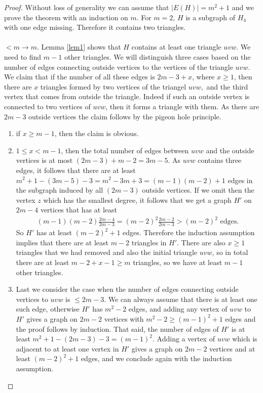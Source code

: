 \documentclass[12pt,a4paper]{article}
\theoremstyle{definition}
\begin{document}
\begin{proof}
Without loss of generality  we can assume that $|E(H)|=m^2+1$ and we prove the theorem with an induction on $m$. For $m=2$, $H$ is a subgraph of $H_4$ with one edge missing. Therefore it contains two triangles. \\
\\
$<m \to m$. Lemma \ref{lem1} shows that $H$ contains at least one triangle $uvw$. We need to find $m-1$ other triangles. We will distinguish three cases based on the number of edges connecting outside vertices to the vertices of the triangle $uvw$. We claim that if the number of all these edges is $2m-3+x$, where $x \geq 1$, then there are $x$ triangles formed by two vertices of the triangel $uvw,$ and the third vertex that comes from outside the triangle. Indeed if such an outside vertex is connected to two vertices of $uvw$, then it forms a triangle with them. As there are $2m-3$ outside vertices the claim follows by the pigeon hole principle.
\begin{enumerate}
\item if $x \geq m-1$,  then the claim is obvious.
\item $1 \leq x < m-1$, then the total number of edges between $uvw$ and the outside vertices is at most $(2m-3)+m-2=3m-5$. As $uvw$ contains three edges, it follows that there are at least $m^2+1-(3m-5)-3=m^2-3m+3=(m-1)(m-2)+1$ edges in the subgraph induced by all $(2m-3)$ outside vertices. If we omit then the vertex $z$ which has the smallest degree, it follows that we get a graph $H'$ on $2m-4$ vertices  that has at least 
\begin{align*}
(m-1)(m-2) \frac{2m-4}{2m-3}=(m-2)^2 \frac{2m-2}{2m-3}>(m-2)^2 \text{ edges.}
\end{align*}
So $H'$ has at least $(m-2)^2 +1$ edges. Therefore the induction assumption implies that there are at least $m-2$ triangles in $H'$. There are also $x\geq 1$ triangles that we had removed and also the initial triangle $uvw$, so in total there are at least  $m-2+x-1\geq m$ triangles, so we have at least $m-1$ other triangles. 
\item Last we consider the case when the number of edges connecting outside vertices to $uvw$ is $ \leq 2m-3$. We can always assume that there is at least one such edge, otherwise $H'$ has $m^2-2$ edges, and adding any vertex of $uvw$ to $H'$ gives a graph on $2m-2$ vertices with $m^2-2 \geq (m-1)^2+1$ edges and the proof follows by induction. That said, the number of edges of $H'$ is at least $m^2+1-(2m-3)-3=(m-1)^2$. Adding a vertex of $uvw$ which is adjacent to at least one vertex in $H'$ gives a graph on $2m-2$ vertices and at least $(m-2)^2+1$ edges, and we conclude again with the induction assumption. 
\end{enumerate}
\end{proof}
\end{document}
